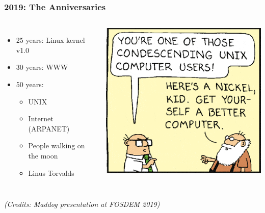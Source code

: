 \documentclass[aspectratio=169]{beamer}
\begin{document}
\begin{frame}
  \frametitle{2019: The Anniversaries}
  \begin{columns}
  \begin{itemize}
    \item 25 years: Linux kernel v1.0
    \item 30 years: WWW
    \item 50 years:
    \begin{itemize}
      \item UNIX
      \item Internet (ARPANET)
      \item People walking on the moon
      \item Linus Torvalds
    \end{itemize}
  \end{itemize}
      \pause
      \includegraphics[scale=0.5]{images/nickel.png}
  \end{columns}

  \textit{(Credits: Maddog presentation at FOSDEM 2019)}
\end{frame}
\end{document}

